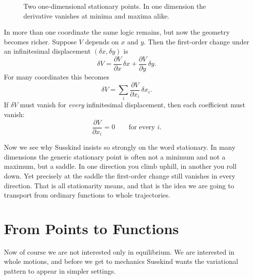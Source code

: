 \begin{figure}[h]
\centering
{}
\caption{Two one-dimensional stationary points. In one dimension the derivative vanishes at minima and maxima alike.}
\end{figure}

In more than one coordinate the same logic remains, but now the geometry becomes richer. Suppose \(V\) depends on \(x\) and \(y\). Then the first-order change under an infinitesimal displacement \((\delta x,\delta y)\) is
\begin{equation}
\delta V=\frac{\partial V}{\partial x}\,\delta x+\frac{\partial V}{\partial y}\,\delta y.
\end{equation}
For many coordinates this becomes
\begin{equation}
\delta V=\sum_i \frac{\partial V}{\partial x_i}\,\delta x_i.
\end{equation}
If \(\delta V\) must vanish for \emph{every} infinitesimal displacement, then each coefficient must vanish:
\begin{equation}
\frac{\partial V}{\partial x_i}=0 \qquad \text{for every } i.
\end{equation}

Now we see why Susskind insists so strongly on the word stationary. In many dimensions the generic stationary point is often not a minimum and not a maximum, but a saddle. In one direction you climb uphill, in another you roll down. Yet precisely at the saddle the first-order change still vanishes in every direction. That is all stationarity means, and that is the idea we are going to transport from ordinary functions to whole trajectories.

\section{From Points to Functions}

Now of course we are not interested only in equilibrium. We are interested in whole motions, and before we get to mechanics Susskind wants the variational pattern to appear in simpler settings.

